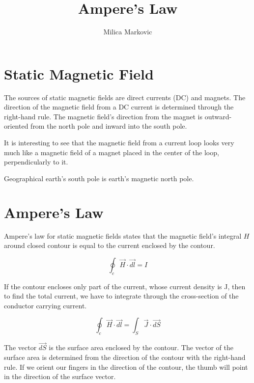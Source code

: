 \documentclass{ximera}
\title{Ampere's Law}
\author{Milica Markovic}
\begin{document}
  
\begin{abstract}  

\end{abstract}  
\maketitle    






\section{Static Magnetic Field}

The sources of static magnetic fields are direct currents (DC) and magnets. The direction of the magnetic field from a DC current is determined through the right-hand rule. The magnetic field's direction from the magnet is outward-oriented from the north pole and inward into the south pole.

It is interesting to see that the magnetic field from a current loop looks very much like a magnetic field of a magnet placed in the center of the loop, perpendicularly to it. 

Geographical earth's south pole is earth's magnetic north pole.


\section{Ampere's Law}


Ampere's law for static magnetic fields states that the magnetic field's integral $H$ around closed contour is equal to the current enclosed by the contour.

\begin{equation}
\oint_c \vec{H} \cdot \vec{dl} = I
\end{equation}


If the contour encloses only part of the current, whose current density is J, then to find the total current, we have to integrate through the cross-section of the conductor carrying current.


\begin{equation}
\oint_c \vec{H} \cdot \vec{dl} = \int_S \vec{J} \cdot \vec{dS}
\end{equation}


The vector $\vec{dS}$ is the surface area enclosed by the contour. The vector of the surface area is determined from the direction of the contour with the right-hand rule. If we orient our fingers in the direction of the contour, the thumb will point in the direction of the surface vector.
\end{document}

